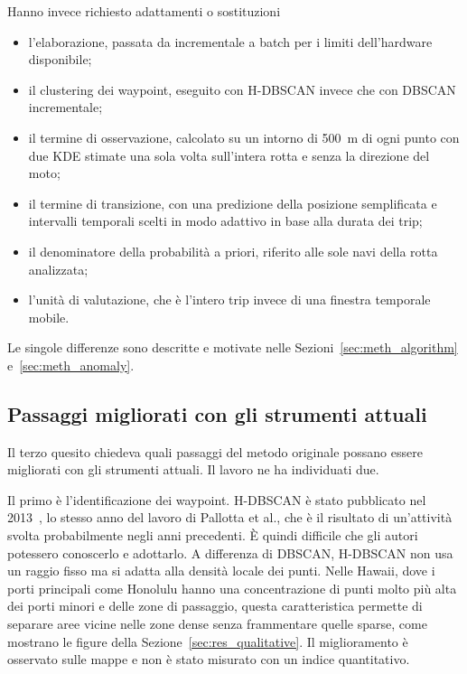 Hanno invece richiesto adattamenti o sostituzioni
\begin{itemize}
    \item l'elaborazione, passata da incrementale a batch per i limiti dell'hardware disponibile;
    \item il clustering dei waypoint, eseguito con H-DBSCAN invece che con DBSCAN incrementale;
    \item il termine di osservazione, calcolato su un intorno di 500~m di ogni punto con due KDE stimate una sola volta sull'intera rotta e senza la direzione del moto;
    \item il termine di transizione, con una predizione della posizione semplificata e intervalli temporali scelti in modo adattivo in base alla durata dei trip;
    \item il denominatore della probabilità a priori, riferito alle sole navi della rotta analizzata;
    \item l'unità di valutazione, che è l'intero trip invece di una finestra temporale mobile.
\end{itemize}
Le singole differenze sono descritte e motivate nelle Sezioni~\ref{sec:meth_algorithm}
e~\ref{sec:meth_anomaly}.

\subsection[Passaggi migliorati con gli strumenti attuali]{Passaggi migliorati con gli strumenti attuali}

Il terzo quesito chiedeva quali passaggi del metodo originale possano essere migliorati con gli
strumenti attuali. Il lavoro ne ha individuati due.

Il primo è l'identificazione dei waypoint. H-DBSCAN è stato pubblicato nel 2013~\cite{campello2013}, lo stesso
anno del lavoro di Pallotta et al., che è il risultato di un'attività svolta probabilmente negli anni precedenti.
È quindi difficile che gli autori potessero conoscerlo e adottarlo. A differenza di DBSCAN,
H-DBSCAN non usa un raggio fisso ma si adatta alla densità locale dei punti. Nelle
Hawaii, dove i porti principali come Honolulu hanno una concentrazione di punti molto più alta dei
porti minori e delle zone di passaggio, questa caratteristica permette di separare aree vicine nelle
zone dense senza frammentare quelle sparse, come mostrano le figure della
Sezione~\ref{sec:res_qualitative}. Il miglioramento è osservato sulle mappe e non è stato misurato
con un indice quantitativo.


